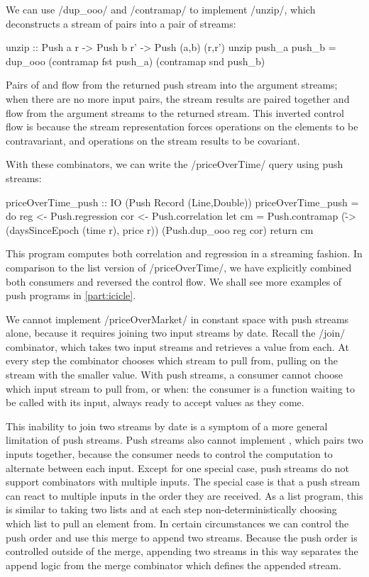 We can use \Hs/dup_ooo/ and \Hs/contramap/ to implement \Hs/unzip/, which deconstructs a stream of pairs into a pair of streams:

\begin{haskell}
unzip :: Push a r -> Push b r' -> Push (a,b) (r,r')
unzip push_a push_b = dup_ooo (contramap fst push_a) (contramap snd push_b)
\end{haskell}

Pairs of \Hs@a@ and \Hs@b@ flow from the returned push stream into the argument streams; when there are no more input pairs, the stream results are paired together and flow from the argument streams to the returned stream.
This inverted control flow is because the stream representation forces operations on the elements to be contravariant, and operations on the stream results to be covariant.

With these combinators, we can write the \Hs/priceOverTime/ query using push streams:

\begin{haskell}
priceOverTime_push :: IO (Push Record (Line,Double))
priceOverTime_push = do
  reg   <- Push.regression
  cor   <- Push.correlation
  let cm = Push.contramap
    (\r -> (daysSinceEpoch (time r), price r))
    (Push.dup_ooo reg cor)
  return cm
\end{haskell}

This program computes both correlation and regression in a streaming fashion.
In comparison to the list version of \Hs/priceOverTime/, we have explicitly combined both consumers and reversed the control flow.
We shall see more examples of push programs in \cref{part:icicle}.

We cannot implement \Hs/priceOverMarket/ in constant space with push streams alone, because it requires joining two input streams by date.
Recall the \Hs/join/ combinator, which takes two input streams and retrieves a value from each.
At every step the combinator chooses which stream to pull from, pulling on the stream with the smaller value.
With push streams, a consumer cannot choose which input stream to pull from, or when: the consumer is a function waiting to be called with its input, always ready to accept values as they come.

This inability to join two streams by date is a symptom of a more general limitation of push streams.
Push streams also cannot implement \Hs@zip@, which pairs two inputs together, because the consumer needs to control the computation to alternate between each input.
Except for one special case, push streams do not support combinators with multiple inputs.
The special case is that a push stream can react to multiple inputs in the order they are received.
As a list program, this is similar to taking two lists and at each step non-deterministically choosing which list to pull an element from.
In certain circumstances we can control the push order and use this merge to append two streams.
Because the push order is controlled outside of the merge, appending two streams in this way separates the append logic from the merge combinator which defines the appended stream.

